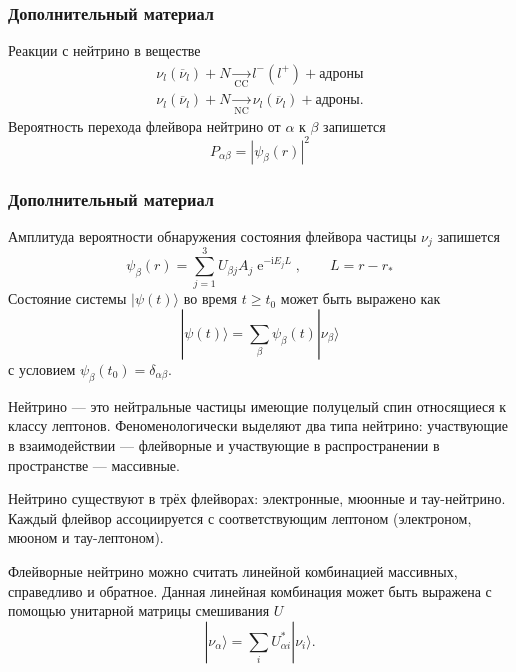 \documentclass[utf8,9pt,mathserif,usepdftitle=false]{beamer}
\renewcommand{\exp}{\operatorname{e}}
\renewcommand{\imath}{\mathrm{i}}
\begin{document}
\begin{frame}
  \frametitle{Дополнительный материал}%
  Реакции с нейтрино в веществе
  \begin{align*}
    \nu_{l}(\overline{\nu}_{l})+N\xrightarrow[\text{CC}]{}l^{-}(l^{+})+\text{адроны}\\[2ex]
    \nu_{l}(\overline{\nu}_{l})+N\xrightarrow[\text{NC}]{}\nu_{l}(\overline{\nu}_{l})+\text{адроны}.
  \end{align*}
  	Вероятность перехода флейвора нейтрино от \(\alpha\) к \(\beta\) запишется
  \begin{equation}
  	P_{\alpha \beta}=|\psi_{\beta}(r)|^{2}
  \end{equation}
\end{frame}
\begin{frame}
  \frametitle{Дополнительный материал}
  Амплитуда вероятности обнаружения состояния флейвора частицы \(\nu_{j}\) запишется
  \begin{equation}
  	\psi_{\beta}(r)=\sum_{j=1}^{3}U_{\beta j}A_{j}\exp^{-\imath E_{j}L}, \qquad L=r-r_{*}
  \end{equation}
  Состояние системы \(|\psi(t)\rangle\) во время \(t \geqslant t_{0}\) может быть выражено как
  \begin{equation}
  	|\psi(t)\rangle=\sum_{\beta}\psi_{\beta}(t)|\nu_{\beta}\rangle
  \end{equation}
  с условием \(\psi_{\beta}(t_{0})=\delta_{\alpha \beta}\).
  
   Нейтрино — это нейтральные частицы имеющие полуцелый спин относящиеся к классу
  лептонов. Феноменологически выделяют два типа нейтрино: участвующие в
  взаимодействии — флейворные и участвующие в распространении в пространстве —
  массивные.
  
  Нейтрино существуют в трёх флейворах: электронные, мюонные и
  тау-нейтрино. Каждый флейвор ассоциируется с соответствующим лептоном
  (электроном, мюоном и тау-лептоном).
  
  Флейворные нейтрино можно считать линейной комбинацией массивных, справедливо и 
  обратное. Данная линейная комбинация может быть выражена с помощью унитарной
  матрицы смешивания \(U\)
  \begin{equation}
  	|\nu_{\alpha}\rangle=\sum_{i}U_{\alpha i}^{*}|\nu_{i}\rangle.
  \end{equation}
  \end{frame}
\end{document}
